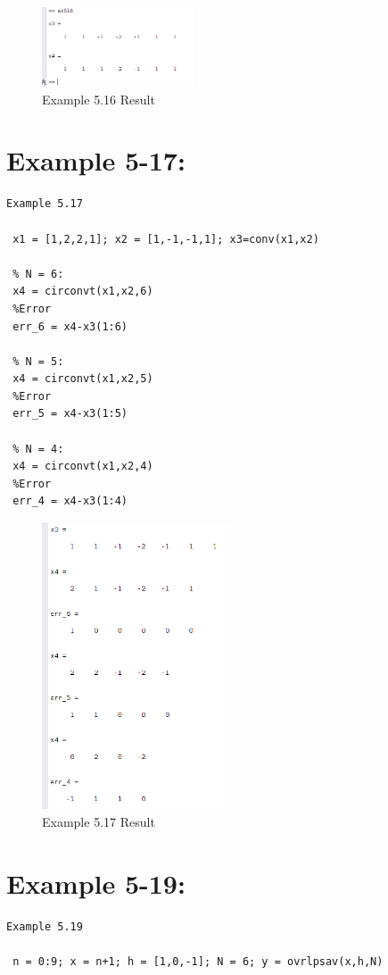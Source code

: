 \documentclass[11pt
  , a4paper
  , article
  , oneside
]{memoir}
\begin{document}
\begin{figure}[h!]
	\centering
	\includegraphics[width=0.4\textwidth,height=0.2\textwidth]{./images/ex516.png}
	\caption{Example 5.16 Result}
	\label{fig:Example 5.61 Result}
\end{figure}

\chapter{Example 5-17:}
\begin{lstlisting}[style=termstyle]
 Example 5.17
 
 x1 = [1,2,2,1]; x2 = [1,-1,-1,1]; x3=conv(x1,x2)
 
 % N = 6:
 x4 = circonvt(x1,x2,6)
 %Error
 err_6 = x4-x3(1:6)
 
 % N = 5:
 x4 = circonvt(x1,x2,5)
 %Error
 err_5 = x4-x3(1:5)
 
 % N = 4:
 x4 = circonvt(x1,x2,4)
 %Error
 err_4 = x4-x3(1:4)
\end{lstlisting}

\begin{figure}[h!]
	\centering
	\includegraphics[width=0.5\textwidth,height=0.4\textwidth]{./images/ex517.png}
	\caption{Example 5.17 Result}
	\label{fig:Example 5.17 Result}
\end{figure}

\clearpage

\chapter{Example 5-19:}
\begin{lstlisting}[style=termstyle]
 Example 5.19
 
 n = 0:9; x = n+1; h = [1,0,-1]; N = 6; y = ovrlpsav(x,h,N)
\end{lstlisting}
\end{document}
